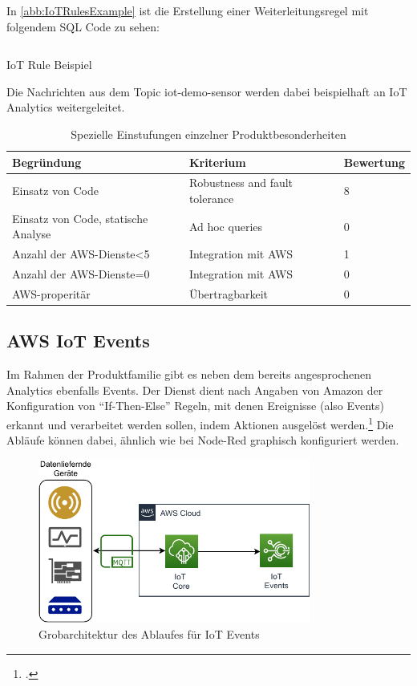 In \autoref{abb:IoTRulesExample} ist die Erstellung einer Weiterleitungsregel mit folgendem SQL Code zu sehen:
\begin{listing}[H]
\inputminted[frame=lines,breaklines=true]{sql}{code/iot-rules-example.sql}
\caption{IoT Rule Beispiel}
\label{listing:iot-rule-example}
\end{listing}
Die Nachrichten aus dem Topic iot-demo-sensor werden dabei beispielhaft an IoT Analytics weitergeleitet.

\begin{table}[H]
\centering
\begin{tabular}{|l|l|l|}
\hline
\rowcolor[HTML]{ECF4FF} 
Begründung & Kriterium & Bewertung \\ \hline
Einsatz von Code & Robustness and fault tolerance & 8 \\ \hline
Einsatz von Code, statische Analyse & Ad hoc queries & 0 \\ \hline
Anzahl der AWS-Dienste\textless{}5 & Integration mit AWS & 1 \\ \hline
Anzahl der AWS-Dienste=0 & Integration mit AWS & 0 \\ \hline
AWS-properitär & Übertragbarkeit & 0 \\ \hline
\end{tabular}
\caption{Spezielle Einstufungen einzelner Produktbesonderheiten}
\label{tab:einstufungen}
\end{table}



\subsection{AWS IoT Events}
Im Rahmen der \AWSIOT Produktfamilie gibt es neben dem bereits angesprochenen \AWSIOT Analytics ebenfalls \AWSIOT Events.  
Der Dienst dient nach Angaben von Amazon der Konfiguration von \enquote{If-Then-Else} Regeln, mit denen Ereignisse (also Events) erkannt und verarbeitet werden sollen, indem Aktionen ausgelöst werden.\footcite[Vgl.][]{AmazonWebServicesInc..o.J.b} Die Abläufe können dabei, ähnlich wie bei Node-Red graphisch konfiguriert werden. 
\begin{figure}[H]
\centering
\includegraphics[width=0.8\textwidth]{graphics/IoT-Events-general.pdf}
\caption{Grobarchitektur des Ablaufes für IoT Events}
\label{abb:GrobArchitekturIoTEvents}
\end{figure}

